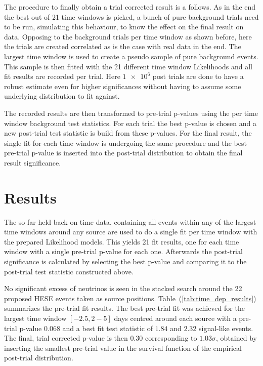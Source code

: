 The procedure to finally obtain a trial corrected result is a follows.
As in the end the best out of 21 time windows is picked, a bunch of pure background trials need to be run, simulating this behaviour, to know the effect on the final result on data.
Opposing to the background trials per time window as shown before, here the trials are created correlated as is the case with real data in the end.
The largest time window is used to create a pseudo sample of pure background events.
This sample is then fitted with the 21 different time window Likelihoods and all fit results are recorded per trial.
Here $\num{1e6}$ post trials are done to have a robust estimate even for higher significances without having to assume some underlying distribution to fit against.

The recorded results are then transformed to pre-trial p-values using the per time window background test statistics.
For each trial the best p-value is chosen and a new post-trial test statistic is build from these p-values.
For the final result, the single fit for each time window is undergoing the same procedure and the best pre-trial p-value is inserted into the post-trial distribution to obtain the final result significance.

\section{Results}
The so far held back on-time data, containing all events within any of the largest time windows around any source are used to do a single fit per time window with the prepared Likelihood models.
This yields 21 fit results, one for each time window with a single pre-trial p-value for each one.
Afterwards the post-trial significance is calculated by selecting the best p-value and comparing it to the post-trial test statistic constructed above.

No significant excess of neutrinos is seen in the stacked search around the 22 proposed HESE events taken as source positions.
Table~(\ref{tab:time_dep_results}) summarizes the pre-trial fit results.
The best pre-trial fit was achieved for the largest time window $[-2.5, 2-5]$ days centred around each source with a pre-trial p-value $\num{0.068}$ and a best fit test statistic of $\num{1.84}$ and $\num{2.32}$ signal-like events.
The final, trial corrected p-value is then $\num{0.30}$ corresponding to $\num{1.03}\sigma$, obtained by inserting the smallest pre-trial value in the survival function of the empirical post-trial distribution.


